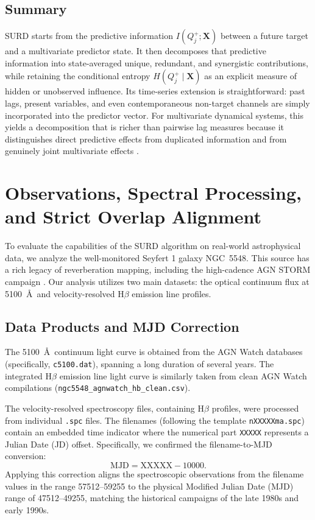 \documentclass[fleqn,usenatbib]{mnras}
\begin{document}
\subsection{Summary}

SURD starts from the predictive information \(I(Q_j^+;\mathbf{X})\) between a future target and a multivariate predictor state. It then decomposes that predictive information into state-averaged unique, redundant, and synergistic contributions, while retaining the conditional entropy \(H(Q_j^+\mid \mathbf{X})\) as an explicit measure of hidden or unobserved influence. Its time-series extension is straightforward: past lags, present variables, and even contemporaneous non-target channels are simply incorporated into the predictor vector. For multivariate dynamical systems, this yields a decomposition that is richer than pairwise lag measures because it distinguishes direct predictive effects from duplicated information and from genuinely joint multivariate effects \cite{MartinezSanchez2024SURD,WilliamsBeer2010}.

\section{Observations, Spectral Processing, and Strict Overlap Alignment}
\label{sec:data_processing}

To evaluate the capabilities of the SURD algorithm on real-world astrophysical data, we analyze the well-monitored Seyfert 1 galaxy NGC~5548. This source has a rich legacy of reverberation mapping, including the high-cadence AGN STORM campaign \cite{DeRosa2015,Pei2017}. Our analysis utilizes two main datasets: the optical continuum flux at 5100~\AA\ and velocity-resolved H\(\beta\) emission line profiles.

\subsection{Data Products and MJD Correction}

The 5100~\AA\ continuum light curve is obtained from the AGN Watch databases (specifically, \texttt{c5100.dat}), spanning a long duration of several years. The integrated H\(\beta\) emission line light curve is similarly taken from clean AGN Watch compilations (\texttt{ngc5548\_agnwatch\_hb\_clean.csv}).

The velocity-resolved spectroscopy files, containing H\(\beta\) profiles, were processed from individual \texttt{.spc} files. The filenames (following the template \texttt{nXXXXXma.spc}) contain an embedded time indicator where the numerical part \texttt{XXXXX} represents a Julian Date (JD) offset. Specifically, we confirmed the filename-to-MJD conversion:
\begin{equation}
\mathrm{MJD} = \mathrm{XXXXX} - 10000.
\end{equation}
Applying this correction aligns the spectroscopic observations from the filename values in the range 57512--59255 to the physical Modified Julian Date (MJD) range of 47512--49255, matching the historical campaigns of the late 1980s and early 1990s.
\end{document}
